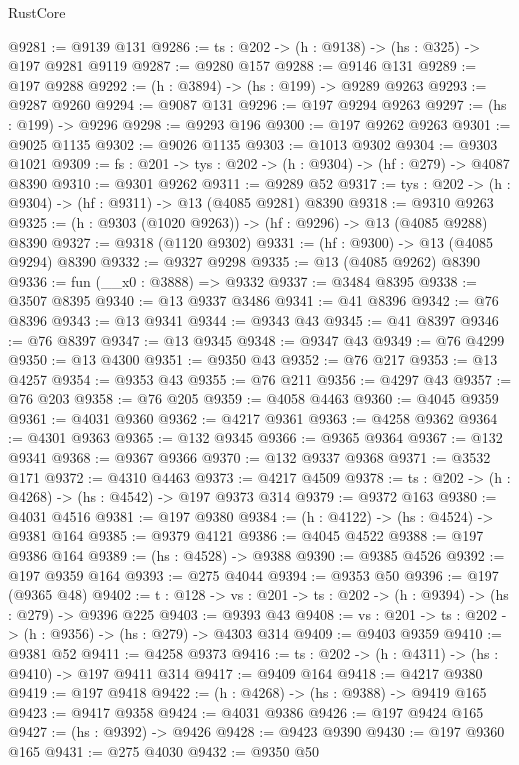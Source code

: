 \begin{lexlean}{RustCore}
\begin{coremodule}
@9281 := @9139 @131
@9286 := {ts : @202} -> (h : @9138) -> (hs : @325) -> @197 @9281 @9119
@9287 := @9280 @157
@9288 := @9146 @131
@9289 := @197 @9288
@9292 := (h : @3894) -> (hs : @199) -> @9289 @9263
@9293 := @9287 @9260
@9294 := @9087 @131
@9296 := @197 @9294 @9263
@9297 := (hs : @199) -> @9296
@9298 := @9293 @196
@9300 := @197 @9262 @9263
@9301 := @9025 @1135
@9302 := @9026 @1135
@9303 := @1013 @9302
@9304 := @9303 @1021
@9309 := {fs : @201} -> {tys : @202} -> (h : @9304) -> (hf : @279) -> @4087 @8390
@9310 := @9301 @9262
@9311 := @9289 @52
@9317 := {tys : @202} -> (h : @9304) -> (hf : @9311) -> @13 (@4085 @9281) @8390
@9318 := @9310 @9263
@9325 := (h : @9303 (@1020 @9263)) -> (hf : @9296) -> @13 (@4085 @9288) @8390
@9327 := @9318 (@1120 @9302)
@9331 := (hf : @9300) -> @13 (@4085 @9294) @8390
@9332 := @9327 @9298
@9335 := @13 (@4085 @9262) @8390
@9336 := fun (__x0 : @3888) => @9332
@9337 := @3484 @8395
@9338 := @3507 @8395
@9340 := @13 @9337 @3486
@9341 := @41 @8396
@9342 := @76 @8396
@9343 := @13 @9341
@9344 := @9343 @43
@9345 := @41 @8397
@9346 := @76 @8397
@9347 := @13 @9345
@9348 := @9347 @43
@9349 := @76 @4299
@9350 := @13 @4300
@9351 := @9350 @43
@9352 := @76 @217
@9353 := @13 @4257
@9354 := @9353 @43
@9355 := @76 @211
@9356 := @4297 @43
@9357 := @76 @203
@9358 := @76 @205
@9359 := @4058 @4463
@9360 := @4045 @9359
@9361 := @4031 @9360
@9362 := @4217 @9361
@9363 := @4258 @9362
@9364 := @4301 @9363
@9365 := @132 @9345
@9366 := @9365 @9364
@9367 := @132 @9341
@9368 := @9367 @9366
@9370 := @132 @9337 @9368
@9371 := @3532 @171
@9372 := @4310 @4463
@9373 := @4217 @4509
@9378 := {ts : @202} -> (h : @4268) -> (hs : @4542) -> @197 @9373 @314
@9379 := @9372 @163
@9380 := @4031 @4516
@9381 := @197 @9380
@9384 := (h : @4122) -> (hs : @4524) -> @9381 @164
@9385 := @9379 @4121
@9386 := @4045 @4522
@9388 := @197 @9386 @164
@9389 := (hs : @4528) -> @9388
@9390 := @9385 @4526
@9392 := @197 @9359 @164
@9393 := @275 @4044
@9394 := @9353 @50
@9396 := @197 (@9365 @48)
@9402 := {t : @128} -> {vs : @201} -> {ts : @202} -> (h : @9394) -> (hs : @279) -> @9396 @225
@9403 := @9393 @43
@9408 := {vs : @201} -> {ts : @202} -> (h : @9356) -> (hs : @279) -> @4303 @314
@9409 := @9403 @9359
@9410 := @9381 @52
@9411 := @4258 @9373
@9416 := {ts : @202} -> (h : @4311) -> (hs : @9410) -> @197 @9411 @314
@9417 := @9409 @164
@9418 := @4217 @9380
@9419 := @197 @9418
@9422 := (h : @4268) -> (hs : @9388) -> @9419 @165
@9423 := @9417 @9358
@9424 := @4031 @9386
@9426 := @197 @9424 @165
@9427 := (hs : @9392) -> @9426
@9428 := @9423 @9390
@9430 := @197 @9360 @165
@9431 := @275 @4030
@9432 := @9350 @50

\end{coremodule}
\end{lexlean}

